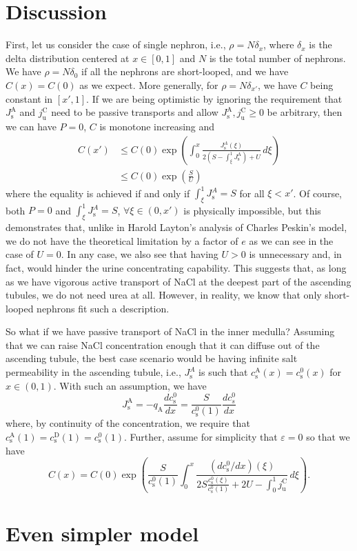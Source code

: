 \documentclass{article}
\begin{document}
\section{Discussion}

First, let us consider the case of single nephron, i.e., $\rho = N\delta_x$, where $\delta_x$ is the delta distribution centered at $x\in [0,1]$ and $N$ is the total number of nephrons.
We have $\rho = N\delta_0$ if all the nephrons are short-looped, and we have $C(x) = C(0)$ as we expect.
More generally, for $\rho = N\delta_{x'}$, we have $C$ being constant in $[x',1]$.
If we are being optimistic by ignoring the requirement that $J_\mathrm{s}^\mathrm{A}$ and $j_\mathrm{u}^\mathrm{C}$ need to be passive transports and allow $J_\mathrm{s}^\mathrm{A},j_\mathrm{u}^\mathrm{C}\geq 0$ be arbitrary, then we can have $P=0$, $C$ is monotone increasing and
\begin{equation}
    \begin{split}
        C(x') &\leq C(0)\exp\left( \int_0^x\frac{J_\mathrm{s}^A(\xi)}{ 2\left( S-\int_\xi^1J_\mathrm{s}^\mathrm{A} \right)+U}\,d\xi \right)\\
        &\leq C(0)\exp\left( \frac{S}{U} \right)
    \end{split}
\end{equation}
    where the equality is achieved if and only if $\int_\xi^1 J_\mathrm{s}^A = S$ for all $\xi<x'$.
Of course, both $P=0$ and $\int_\xi^1 J_\mathrm{s}^A = S$, $\forall \xi\in (0,x')$ is physically impossible, but this demonstrates that, unlike in Harold Layton's analysis of Charles Peskin's model, we do not have the theoretical limitation by a factor of $e$ as we can see in the case of $U=0$.
In any case, we also see that having $U>0$ is unnecessary and, in fact, would hinder the urine concentrating capability.
This suggests that, as long as we have vigorous active transport of NaCl at the deepest part of the ascending tubules, we do not need urea at all.
However, in reality, we know that only short-looped nephrons fit such a description.

So what if we have passive transport of NaCl in the inner medulla?
Assuming that we can raise NaCl concentration enough that it can diffuse out of the ascending tubule, the best case scenario would be having infinite salt permeability in the ascending tubule, i.e., $J_\mathrm{s}^A$ is such that $c_\mathrm{s}^\mathrm{A}(x) = c_\mathrm{s}^0(x)$ for $x\in (0,1)$.
With such an assumption, we have
\begin{equation}
    J_\mathrm{s}^\mathrm{A} = -q_\mathrm{A}\frac{d c_\mathrm{s}^0}{dx} = \frac{S}{c_\mathrm{s}^0(1)}\frac{dc_s^0}{dx}
\end{equation}
    where, by continuity of the concentration, we require that $c_\mathrm{s}^\mathrm{A}(1) = c_\mathrm{s}^\mathrm{D}(1) = c_\mathrm{s}^0(1)$.
Further, assume for simplicity that $\varepsilon = 0$ so that we have
\begin{equation}
    C(x) = C(0)\exp\left( \frac{S}{c_\mathrm{s}^0(1)}\int_0^x\frac{(dc_\mathrm{s}^0/dx)(\xi)}{2 S\frac{c_\mathrm{s}^0(\xi)}{c_\mathrm{s}^0(1)}+2U - \int_0^1 j_\mathrm{u}^\mathrm{C}} \,d\xi\right).
\end{equation}

\section{Even simpler model}
\end{document}
